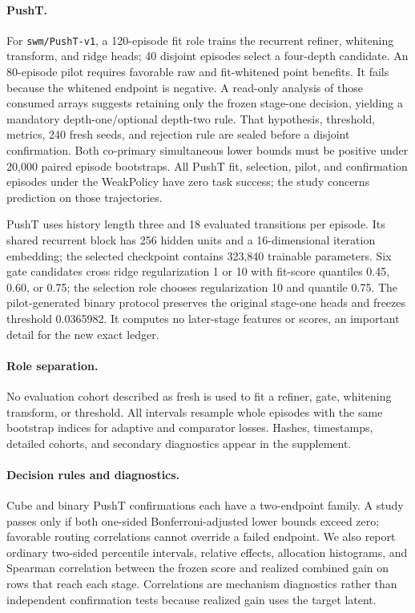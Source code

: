 \documentclass{article}
\begin{document}
\paragraph{PushT.}
For \texttt{swm/PushT-v1}, a 120-episode fit role trains the recurrent refiner, whitening transform, and ridge heads; 40 disjoint episodes select a four-depth candidate. An 80-episode pilot requires favorable raw and fit-whitened point benefits. It fails because the whitened endpoint is negative. A read-only analysis of those consumed arrays suggests retaining only the frozen stage-one decision, yielding a mandatory depth-one/optional depth-two rule. That hypothesis, threshold, metrics, 240 fresh seeds, and rejection rule are sealed before a disjoint confirmation. Both co-primary simultaneous lower bounds must be positive under 20,000 paired episode bootstraps. All PushT fit, selection, pilot, and confirmation episodes under the WeakPolicy have zero task success; the study concerns prediction on those trajectories.

PushT uses history length three and 18 evaluated transitions per episode. Its shared recurrent block has 256 hidden units and a 16-dimensional iteration embedding; the selected checkpoint contains 323,840 trainable parameters. Six gate candidates cross ridge regularization 1 or 10 with fit-score quantiles 0.45, 0.60, or 0.75; the selection role chooses regularization 10 and quantile 0.75. The pilot-generated binary protocol preserves the original stage-one heads and freezes threshold 0.0365982. It computes no later-stage features or scores, an important detail for the new exact ledger.

\paragraph{Role separation.}
No evaluation cohort described as fresh is used to fit a refiner, gate, whitening transform, or threshold. All intervals resample whole episodes with the same bootstrap indices for adaptive and comparator losses. Hashes, timestamps, detailed cohorts, and secondary diagnostics appear in the supplement.

\paragraph{Decision rules and diagnostics.}
Cube and binary PushT confirmations each have a two-endpoint family. A study passes only if both one-sided Bonferroni-adjusted lower bounds exceed zero; favorable routing correlations cannot override a failed endpoint. We also report ordinary two-sided percentile intervals, relative effects, allocation histograms, and Spearman correlation between the frozen score and realized combined gain on rows that reach each stage. Correlations are mechanism diagnostics rather than independent confirmation tests because realized gain uses the target latent.
\end{document}

